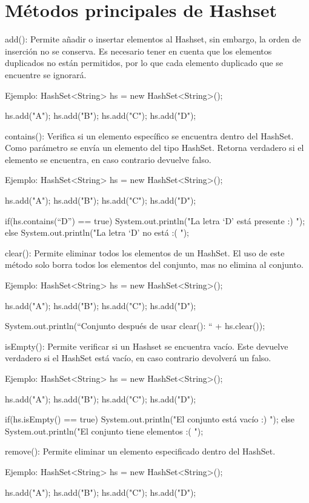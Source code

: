 \documentclass[12pt, letterpaper]{article} %
\begin{document}
\section*{Métodos principales de Hashset}
add():
Permite añadir o insertar elementos al Hashset, sin embargo, la orden de inserción no se conserva. Es necesario tener en cuenta que los elementos duplicados no están permitidos, por lo que cada elemento duplicado que se encuentre se ignorará. 

Ejemplo:
HashSet<String> hs = new HashSet<String>();

hs.add("A");
hs.add("B");
hs.add("C");
hs.add("D");


contains():
Verifica si un elemento específico se encuentra dentro del HashSet. Como parámetro se envía un elemento del tipo HashSet. Retorna  verdadero si el elemento se encuentra, en caso contrario devuelve falso.

Ejemplo:
HashSet<String> hs = new HashSet<String>();

hs.add("A");
hs.add("B");
hs.add("C");
hs.add("D");

if(hs.contains(“D”) == true){
System.out.println("La letra ‘D’ está presente :) ");
}
else{
	System.out.println("La letra ‘D’ no está :( ");
}

clear():
Permite eliminar todos los elementos de un HashSet. El uso de este método solo borra todos los elementos del conjunto, mas no elimina al conjunto.

Ejemplo:
HashSet<String> hs = new HashSet<String>();

hs.add("A");
hs.add("B");
hs.add("C");
hs.add("D");

System.out.println(“Conjunto después de usar clear(): “ + hs.clear());


isEmpty():
Permite verificar si un Hashset se encuentra vacío. Este devuelve verdadero si el HashSet está vacío, en caso contrario devolverá un falso.

Ejemplo:
HashSet<String> hs = new HashSet<String>();

hs.add("A");
hs.add("B");
hs.add("C");
hs.add("D");

if(hs.isEmpty() == true){
System.out.println("El conjunto está vacío :) ");
}
else{
	System.out.println("El conjunto tiene elementos :( ");
}


remove():
Permite eliminar un elemento especificado dentro del HashSet.

Ejemplo:
HashSet<String> hs = new HashSet<String>();

hs.add("A");
hs.add("B");
hs.add("C");
hs.add("D");
\end{document}
